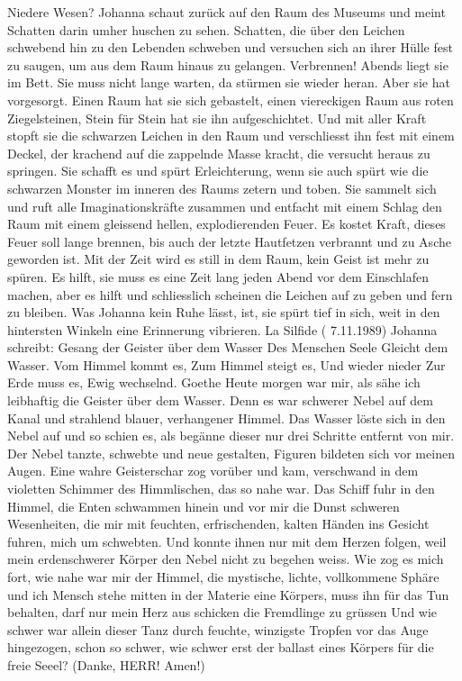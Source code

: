 Niedere Wesen? Johanna schaut zurück auf den Raum des Museums und meint Schatten darin umher huschen zu sehen. Schatten, die über den Leichen schwebend hin zu den Lebenden schweben und versuchen sich an ihrer Hülle fest zu saugen, um aus dem Raum hinaus zu gelangen. 
Verbrennen! Abends liegt sie im Bett. Sie muss nicht lange warten, da stürmen sie wieder heran. Aber sie hat vorgesorgt. Einen Raum hat sie sich gebastelt, einen viereckigen Raum aus roten Ziegelsteinen, Stein für Stein hat sie ihn aufgeschichtet. Und mit aller Kraft stopft sie die schwarzen Leichen in den Raum und verschliesst ihn fest mit einem Deckel, der krachend auf die zappelnde Masse kracht, die versucht heraus zu springen. Sie schafft es und spürt Erleichterung, wenn sie auch spürt wie die schwarzen Monster im inneren des Raums zetern und toben. 
Sie sammelt sich und ruft alle Imaginationskräfte zusammen und entfacht mit einem Schlag den Raum mit einem gleissend hellen, explodierenden Feuer. Es kostet Kraft, dieses Feuer soll lange brennen, bis auch der letzte Hautfetzen verbrannt und zu Asche geworden ist. Mit der Zeit wird es still in dem Raum, kein Geist ist mehr zu spüren.
Es hilft, sie muss es eine Zeit lang jeden Abend vor dem Einschlafen machen, aber es hilft und schliesslich scheinen die Leichen auf zu geben und fern zu bleiben.
Was Johanna kein Ruhe lässt, ist, sie spürt tief in sich, weit in den hintersten Winkeln eine Erinnerung vibrieren. 
 La Silfide ( 7.11.1989)
Johanna schreibt:
Gesang der Geister über dem Wasser
Des Menschen Seele
Gleicht dem Wasser.
Vom Himmel kommt es,
Zum Himmel steigt es,
Und wieder nieder
Zur Erde muss es, 
Ewig wechselnd.
Goethe
Heute morgen war mir, als sähe ich leibhaftig die Geister über dem Wasser.
Denn es war schwerer Nebel auf dem Kanal und strahlend blauer, verhangener Himmel. Das Wasser löste sich in den Nebel auf und so schien es, als begänne dieser nur drei Schritte entfernt von mir. Der Nebel tanzte, schwebte und neue gestalten, Figuren bildeten sich vor meinen Augen. Eine wahre Geisterschar zog vorüber und kam, verschwand in dem violetten Schimmer des Himmlischen, das so nahe war. Das Schiff fuhr in den Himmel, die Enten schwammen hinein und vor mir die Dunst schweren Wesenheiten, die mir mit feuchten, erfrischenden, kalten Händen ins Gesicht fuhren, mich um schwebten. Und konnte ihnen nur mit dem Herzen folgen, weil mein erdenschwerer Körper den Nebel nicht zu  begehen weiss. Wie zog es mich fort, wie nahe war mir der Himmel, die mystische, lichte, vollkommene Sphäre und ich Mensch stehe mitten in der Materie eine Körpers, muss ihn für das Tun behalten, darf nur mein Herz aus schicken die Fremdlinge zu grüssen Und wie schwer war allein dieser Tanz durch feuchte, winzigste Tropfen vor das Auge hingezogen, schon so schwer, wie schwer erst der ballast eines Körpers für die freie Seeel? (Danke, HERR! Amen!)
